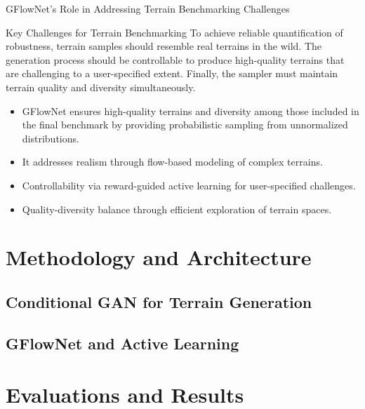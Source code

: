 \documentclass[aspectratio=169,xcolor=dvipsnames]{beamer}
\begin{document}
\begin{frame}{GFlowNet's Role in Addressing Terrain Benchmarking Challenges}
    \begin{block}{Key Challenges for Terrain Benchmarking}
        To achieve reliable quantification of robustness, terrain samples should resemble real terrains in the wild. The generation process should be controllable to produce high-quality terrains that are challenging to a user-specified extent. Finally, the sampler must maintain terrain quality and diversity simultaneously.
    \end{block}
    \begin{itemize}
        \item GFlowNet ensures high-quality terrains and diversity among those included in the final benchmark by providing probabilistic sampling from unnormalized distributions.
        \item It addresses realism through flow-based modeling of complex terrains.
        \item Controllability via reward-guided active learning for user-specified challenges.
        \item Quality-diversity balance through efficient exploration of terrain spaces.
    \end{itemize}
\end{frame}
\section{Methodology and Architecture}

\subsection{Conditional GAN for Terrain Generation}

\subsection{GFlowNet and Active Learning}



\section{Evaluations and Results}
\end{document}
